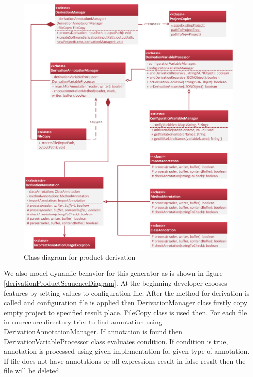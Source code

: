\documentclass[11pt,slovak,a4paper,twoside]{article}
\begin{document}
\begin{figure}[H]  %
					\begin{center}
									\includegraphics[width=\linewidth]{fig/DerivationClassTight.png}
									\caption{Class diagram for product derivation}
									\label{derivationProductClassDiagram}
					\end{center}
\end{figure}


We also model dynamic behavior for this generator as is shown in figure \ref{derivationProductSequenceDiagram}. At the beginning developer chooses features by setting values to configuration file. After the method for derivation is called and configuration file is applied then DerivationManager class firstly copy empty project to specified result place. FileCopy class is used then. For each file in source src directory tries to find annotation using DerivationAnnotationManager. If annotation is found then DerivationVariableProcessor class evaluates condition. If condition is true, annotation is processed using given implementation for given type of annotation. If file does not have annotations or all expressions result in false result then the file will be deleted.
\end{document}
